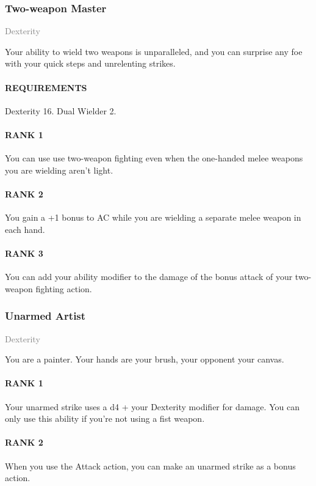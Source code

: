 \subsubsection{Two-weapon Master} \label{feat::twoweaponmaster}
\small{\textcolor{gray}{Dexterity}}

\normalsize
Your ability to wield two weapons is unparalleled, and you can surprise any foe with your quick steps and unrelenting strikes.
\paragraph{REQUIREMENTS} Dexterity 16. Dual Wielder 2.
\paragraph{RANK 1} You can use use two-weapon fighting even when the one-handed melee weapons you are wielding aren't light.
\paragraph{RANK 2} You gain a +1 bonus to AC while you are wielding a separate melee weapon in each hand.
\paragraph{RANK 3} You can add your ability modifier to the damage of the bonus attack of your two-weapon fighting action.

\subsubsection{Unarmed Artist} \label{feat::unarmedartist}
\small{\textcolor{gray}{Dexterity}}

\normalsize
You are a painter.
Your hands are your brush, your opponent your canvas.
\paragraph{RANK 1} Your unarmed strike uses a d4 + your Dexterity modifier for damage.
You can only use this ability if you're not using a fist weapon.
\paragraph{RANK 2} When you use the Attack action, you can make an unarmed strike as a bonus action.
